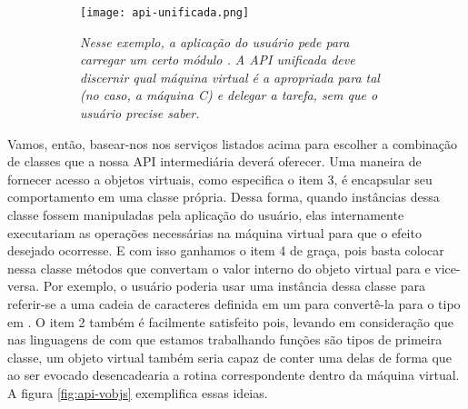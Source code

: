     \begin{figure}[ht]
      \centering
      \caption{}
      \begin{subfigure}{.8\textwidth}
        \begin{center}
          \texttt{[image: api-unificada.png]}
          \vspace{1em}

          \textit{
            Nesse exemplo, a aplicação do usuário pede para carregar um certo
            módulo \script{}. A API unificada deve discernir qual máquina virtual
            é a apropriada para tal (no caso, a máquina C) e delegar a tarefa, sem
            que o usuário precise saber.
          }
        \end{center}
      \end{subfigure}
      \label{fig:api-unificada}
    \end{figure}

    Vamos, então, basear-nos nos serviços listados acima para escolher a combinação de
    classes que a nossa API intermediária deverá oferecer. Uma maneira de fornecer acesso a
    objetos virtuais, como especifica o item 3, é encapsular seu comportamento
    em uma classe própria. Dessa forma, quando instâncias dessa classe fossem
    manipuladas pela aplicação do usuário, elas internamente executariam as
    operações necessárias na máquina virtual para que o efeito desejado
    ocorresse. E com isso ganhamos o item 4 de graça, pois basta colocar
    nessa classe métodos que convertam o valor interno do objeto virtual para
    \CXX{} e vice-versa. Por exemplo, o usuário poderia usar uma instância dessa
    classe para referir-se a uma cadeia de caracteres definida em um \script{}
    para convertê-la para o tipo  em \CXX{}. O item 2 também
    é facilmente satisfeito pois, levando em consideração que nas linguagens de
    \script{} com que estamos trabalhando funções são tipos de primeira
    classe\footnotemark{}, um objeto virtual também seria capaz de conter uma
    delas de forma que ao ser evocado desencadearia a rotina correspondente
    dentro da máquina virtual. A figura \ref{fig:api-vobjs} exemplifica essas
    ideias.


